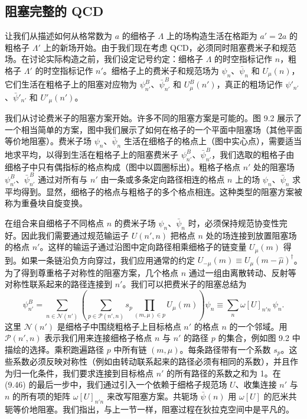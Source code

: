 \subsection{阻塞完整的 QCD}
\label{sec:9.3.1}

让我们从描述如何从格常数为 $a$ 的细格子 $\Lambda$ 上的场构造生活在格距为 $a' = 2a$ 的粗格子 $\Lambda'$ 上的新场开始。由于我们现在考虑 QCD，必须同时阻塞费米子和规范场。在讨论实际构造之前，我们设定记号约定：细格子 $\Lambda$ 的时空指标记作 $n$，粗格子 $\Lambda'$ 的时空指标记作 $n'$。细格子上的费米子和规范场为 $\psi_n$、$\bar\psi_n$ 和 $U_\mu(n)$，它们生活在粗格子上的阻塞对应物为 $\psi^B_{n'}$、$\bar\psi^B_{n'}$ 和 $U^B_\mu(n')$，真正的粗场记作 $\psi'_{n'}$、$\bar\psi'_{n'}$ 和 $U'_\mu(n')$。

我们从讨论费米子的阻塞方案开始。许多不同的阻塞方案是可能的。图 9.2 展示了一个相当简单的方案，图中我们展示了如何在格子的一个平面中阻塞场（其他平面等价地阻塞）。费米子场 $\psi_n$、$\bar\psi_n$ 生活在细格子的格点上（图中实心点），需要适当地求平均，以得到生活在粗格子上的阻塞费米子 $\psi^B_{n'}$、$\bar\psi^B_{n'}$，我们选取的粗格子由细格子中只有偶指标的格点构成（图中以圆圈标出）。粗格子格点 $n'$ 处的阻塞场 $\psi^B_{n'}$、$\bar\psi^B_{n'}$ 通过对所有与 $n'$ 由一条或多条定向路径相连的格点 $n$ 上的场 $\psi_n$、$\bar\psi_n$ 求平均得到。显然，细格子的格点与粗格子的多个格点相连。这种类型的阻塞方案被称为重叠块自旋变换。

在组合来自细格子不同格点 $n$ 的费米子场 $\psi_n$、$\bar\psi_n$ 时，必须保持规范协变性完好。因此我们需要通过规范输运子 $U(n',n)$ 把格点 $n$ 处的场连接到放置阻塞场的格点 $n'$。这样的输运子通过沿图中定向路径相乘细格子的链变量 $U_\mu(m)$ 得到。如果一条链沿负方向穿过，我们应用通常的约定 $U_{-\mu}(m) \equiv U_\mu(m-\hat\mu)^\dagger$。为了得到尊重格子对称性的阻塞方案，几个格点 $n$ 通过一组由离散转动、反射等对称性联系起来的路径连接到 $n'$。我们可以把费米子的阻塞总结为
\begin{equation}
  \psi^B_{n'} = \sum_{n\in\mathcal{N}(n')}
    \left(\sum_{p\in\mathcal{P}(n',n)}s_p\prod_{(m,\mu)\in p}U_\mu(m)\right)\psi_n
  \equiv \sum_n\omega[U]_{n'n}\,\psi_n .
\end{equation}
这里 $\mathcal{N}(n')$ 是细格子中围绕粗格子上目标格点 $n'$ 的格点 $n$ 的一个邻域。用 $\mathcal{P}(n',n)$ 表示我们用来连接细格子格点 $n$ 与 $n'$ 的路径 $p$ 的集合，例如图 9.2 中描绘的选择。乘积跑遍路径 $p$ 中所有链 $(m,\mu)$。每条路径带有一个系数 $s_p$。这些系数必须反映对称性（例如由转动联系起来的路径必须有相同的系数），并且作为归一化条件，我们要求连接到目标格点 $n'$ 的所有路径的系数之和为 1。在 (9.46) 的最后一步中，我们通过引入一个依赖于细格子规范场 $U$、收集连接 $n'$ 与 $n$ 的所有项的矩阵 $\omega[U]_{n'n}$ 来改写阻塞方案。共轭场 $\bar\psi(n)$ 用 $\omega[U]$ 的厄米共轭等价地阻塞。我们指出，与上一节一样，阻塞过程在狄拉克空间中是平凡的。

